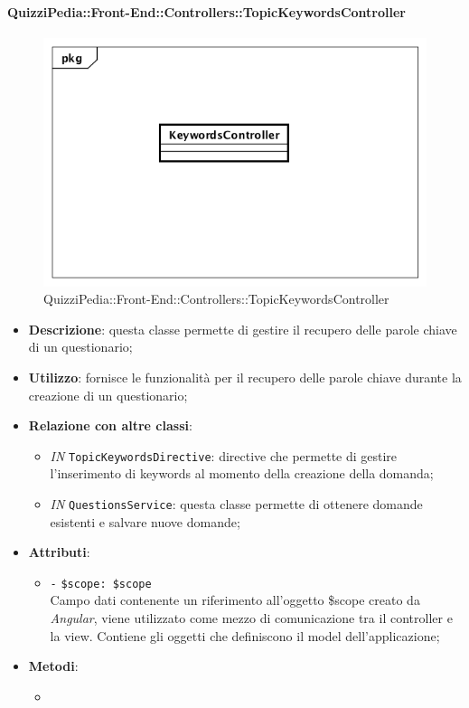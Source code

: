 \paragraph{QuizziPedia::Front-End::Controllers::TopicKeywordsController}
\begin{figure} [ht]
	\centering
	\includegraphics[scale=0.45]{UML/Classi/Front-End/QuizziPedia_Front-end_Controller_TopicKeywordsController.png}
	\caption{QuizziPedia::Front-End::Controllers::TopicKeywordsController}
\end{figure} \FloatBarrier
\begin{itemize}
	\item \textbf{Descrizione}: questa classe permette di gestire il recupero delle parole chiave di un questionario;
	\item \textbf{Utilizzo}: fornisce le funzionalità per il recupero delle parole chiave durante la creazione di un questionario;
	\item \textbf{Relazione con altre classi}:
	\begin{itemize}
		\item \textit{IN} \texttt{TopicKeywordsDirective}: directive che permette di gestire l'inserimento di keywords al momento della creazione della domanda; 
		\item \textit{IN} \texttt{QuestionsService}: questa classe permette di ottenere domande esistenti e salvare nuove domande; 
	\end{itemize}
	\item \textbf{Attributi}:
	\begin{itemize}
		\item \texttt{-} \texttt{\$scope: \$scope} \\
		Campo dati contenente un riferimento all’oggetto \$scope creato da \textit{Angular}, viene utilizzato come mezzo di comunicazione tra il controller e la view. Contiene gli oggetti che definiscono il model dell’applicazione;
	\end{itemize}
	\item \textbf{Metodi}:
	\begin{itemize}
		\item 
	\end{itemize}
\end{itemize}

